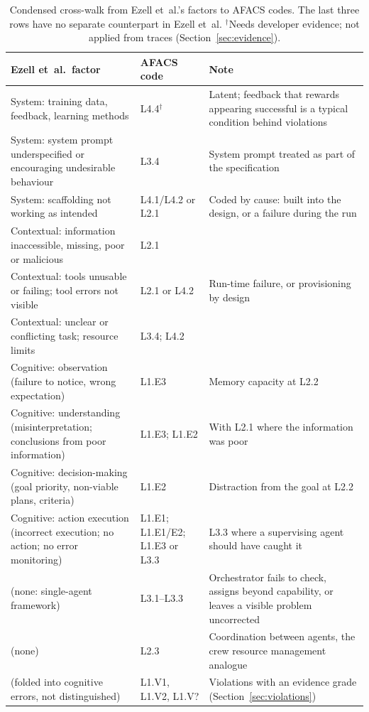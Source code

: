 \documentclass[10pt]{article}
\begin{document}
\begin{table}[tbp]
\centering
\caption{Condensed cross-walk from Ezell et~al.'s factors to AFACS codes. The
last three rows have no separate counterpart in Ezell et~al. $^{\dagger}$Needs
developer evidence; not applied from traces (Section~\ref{sec:evidence}).}
\label{tab:crosswalk}
\small
\begin{tabular}{@{}L{5.2cm}L{3.2cm}L{5.6cm}@{}}
\toprule
Ezell et~al.\ factor & AFACS code & Note\\
\midrule
System: training data, feedback, learning methods & L4.4$^{\dagger}$ & Latent; feedback that rewards appearing successful is a typical condition behind violations\\
System: system prompt underspecified or encouraging undesirable behaviour & L3.4 & System prompt treated as part of the specification\\
System: scaffolding not working as intended & L4.1/L4.2 or L2.1 & Coded by cause: built into the design, or a failure during the run\\
Contextual: information inaccessible, missing, poor or malicious & L2.1 & \\
Contextual: tools unusable or failing; tool errors not visible & L2.1 or L4.2 & Run-time failure, or provisioning by design\\
Contextual: unclear or conflicting task; resource limits & L3.4; L4.2 & \\
Cognitive: observation (failure to notice, wrong expectation) & L1.E3 & Memory capacity at L2.2\\
Cognitive: understanding (misinterpretation; conclusions from poor information) & L1.E3; L1.E2 & With L2.1 where the information was poor\\
Cognitive: decision-making (goal priority, non-viable plans, criteria) & L1.E2 & Distraction from the goal at L2.2\\
Cognitive: action execution (incorrect execution; no action; no error monitoring) & L1.E1; L1.E1/E2; L1.E3 or L3.3 & L3.3 where a supervising agent should have caught it\\
\midrule
(none: single-agent framework) & L3.1--L3.3 & Orchestrator fails to check, assigns beyond capability, or leaves a visible problem uncorrected\\
(none) & L2.3 & Coordination between agents, the crew resource management analogue\\
(folded into cognitive errors, not distinguished) & L1.V1, L1.V2, L1.V? & Violations with an evidence grade (Section~\ref{sec:violations})\\
\bottomrule
\end{tabular}
\end{table}
\end{document}
